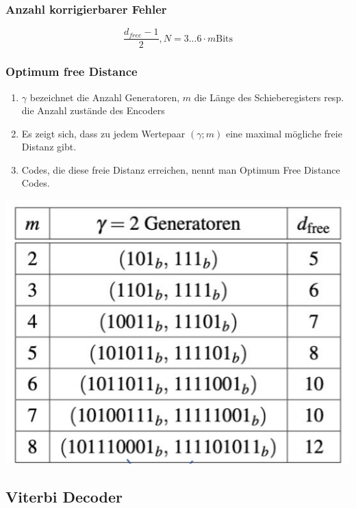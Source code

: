 \subsubsection{Anzahl korrigierbarer Fehler}%
\label{ssub:anzahl_korrigierbarer_fehler}
\[
    \frac{d_{free}-1}{2}, N=3 ... 6 \cdot m \text{Bits}
\]

\subsubsection{Optimum free Distance}%
\label{ssub:optimum_free_distance}

\begin{enumerate}
    \item $\gamma$ bezeichnet die Anzahl Generatoren, $m$ die Länge des Schieberegisters resp. die Anzahl zustände des Encoders
    \item Es zeigt sich, dass zu jedem Wertepaar $(\gamma; m)$ eine maximal mögliche freie Distanz gibt.
    \item Codes, die diese freie Distanz erreichen, nennt man Optimum Free Distance Codes.
\end{enumerate}

\begin{center}
\includegraphics[width=1\linewidth]{images/ofdcodes.png}
\end{center}

\subsection{Viterbi Decoder}%
\label{sub:viterbi_decoder}

